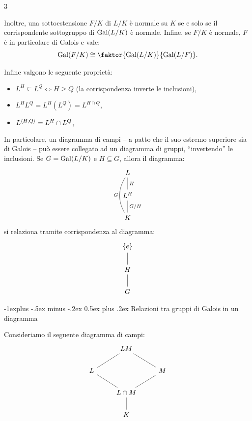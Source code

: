 \documentclass[10pt,landscape]{article}
\makeatletter
\renewcommand{\subsection}{\@startsection{subsection}{2}{0mm}%
	{-1explus -.5ex minus -.2ex}%
	{0.5ex plus .2ex}%
	{\normalfont\normalsize\bfseries}}
\makeatother
\begin{document}
\begin{multicols}{3}
\begin{theorem}
		Inoltre, una sottoestensione $F / K$ di
		$L / K$ è normale su $K$ se e solo se
		il corrispondente sottogruppo di $\operatorname{Gal}(L / K)$
		è normale. Infine, se $F / K$ è normale,
		$F$ è in particolare di Galois e vale:
		\[ \Gal(F / K) \cong \faktor{\Gal(L / K)}{\Gal(L / F)}. \]

		Infine valgono le seguente proprietà:
		\begin{itemize}
			\item $L^H \subseteq L^Q \iff H \geq Q$ (la corrispondenza inverte le inclusioni),
			\item $L^H L^Q = L^H(L^Q) = L^{H \cap Q}$,
			\item $L^{\langle H, Q \rangle} = L^H \cap L^Q$,
		\end{itemize}
	\end{theorem}

	In particolare, un diagramma di campi -- a patto
	che il suo estremo superiore sia di Galois -- può
	essere collegato ad un diagramma di gruppi,
	``invertendo'' le inclusioni. Se
	$G = \operatorname{Gal}(L / K)$ e $H \subseteq G$, allora il
	diagramma:
	\[\begin{tikzcd}
			L \\
			{L^H} \\
			K
			\arrow["G", bend left, no head, from=3-1, to=1-1]
			\arrow["{G/H}"', no head, from=3-1, to=2-1]
			\arrow["H"', no head, from=2-1, to=1-1]
		\end{tikzcd}\]
	si relaziona tramite corrispondenza al
	diagramma:
	\[\begin{tikzcd}[row sep=small]
			{\{e\}} \\
			\\
			H \\
			\\
			G
			\arrow[no head, from=1-1, to=3-1]
			\arrow[no head, from=3-1, to=5-1]
		\end{tikzcd}\]

	\subsection{Relazioni tra gruppi di Galois in un diagramma}

	Consideriamo il seguente diagramma di campi:
	\[\begin{tikzcd}
			& LM \\
			L & {} & M \\
			& {L \cap M} \\
			& K
			\arrow[no head, from=4-2, to=3-2]
			\arrow[no head, from=3-2, to=2-1]
			\arrow[no head, from=2-1, to=1-2]
			\arrow[no head, from=3-2, to=2-3]
			\arrow[no head, from=2-3, to=1-2]
		\end{tikzcd}\]


\end{multicols}
\end{document}
